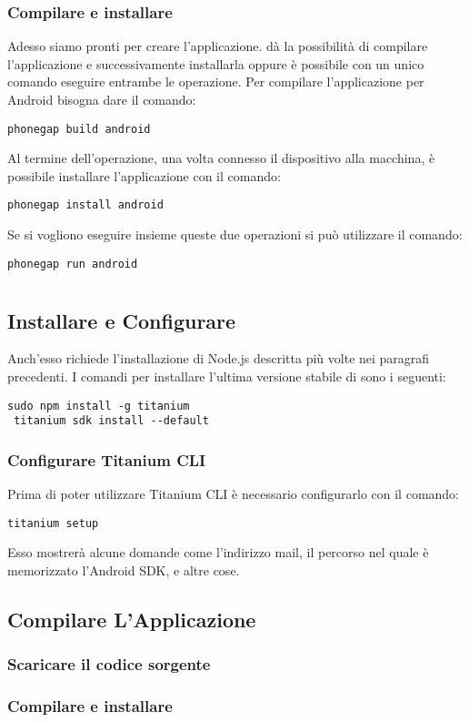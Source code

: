         \subsubsection{Compilare e installare}
            Adesso siamo pronti per creare l'applicazione. \pg{} dà la 
            possibilità di compilare l'applicazione e successivamente 
            installarla oppure è possibile con un unico comando eseguire 
            entrambe le operazione. Per compilare l'applicazione per Android 
            bisogna dare il comando:
            \begin{lstlisting}[language=plane]
 phonegap build android
            \end{lstlisting}
            Al termine dell'operazione, una volta connesso il dispositivo alla 
            macchina, è possibile installare l'applicazione con il comando:
            \begin{lstlisting}[language=plane]
 phonegap install android
            \end{lstlisting}
            
            Se si vogliono eseguire insieme queste due operazioni si può 
            utilizzare il comando:
            \begin{lstlisting}[language=plane]
 phonegap run android
            \end{lstlisting}

\section{\tisdk{}}

    \subsection{Installare e Configurare \tisdk{}}
    Anch'esso richiede l'installazione di Node.js descritta più volte nei
    paragrafi precedenti. I comandi per installare l'ultima versione stabile
    di \tisdk{} sono i seguenti:
    \begin{lstlisting}[language=plane]
 sudo npm install -g titanium
 titanium sdk install --default
    \end{lstlisting}
        \subsubsection{Configurare Titanium CLI}
        Prima di poter utilizzare Titanium CLI è necessario configurarlo con
        il comando:
    \begin{lstlisting}[language=plane]
 titanium setup
    \end{lstlisting}
    Esso mostrerà alcune domande come l'indirizzo mail, il percorso nel quale
    è memorizzato l'Android SDK, e altre cose.
    
    \subsection{Compilare L'Applicazione}
        \subsubsection{Scaricare il codice sorgente}
        \subsubsection{Compilare e installare}
